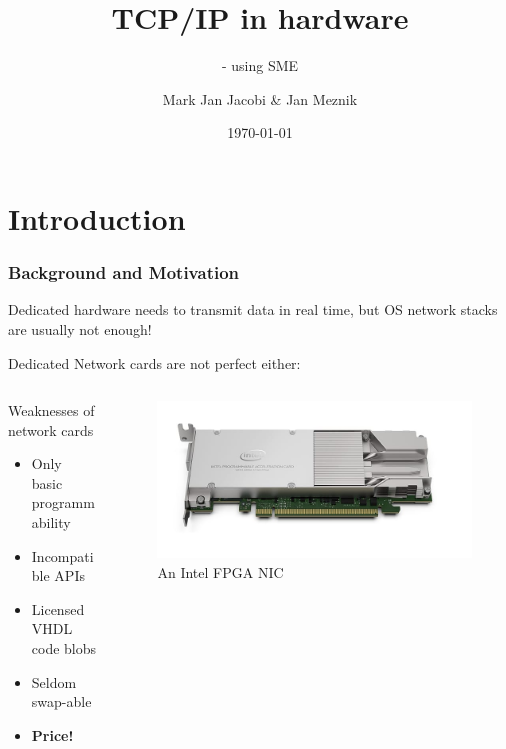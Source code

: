 \documentclass{beamer}
\title{TCP/IP in hardware }
\subtitle{- using SME}
\author{Mark Jan Jacobi \& Jan Meznik}
\institute{University of Copenhagen}
\date{\today}
\begin{document}
\frame{\titlepage}

\section{Introduction}
\begin{frame}
  \frametitle{Background and Motivation}

  Dedicated hardware needs to transmit data in real time, but OS network
  stacks are usually not enough!

  Dedicated Network cards are not perfect either:
  \begin{columns}

 \begin{column}{0.7\textwidth}
  \begin{alertblock}{Weaknesses of network cards}
    \begin{itemize}
      \item Only basic programmability
      \item Incompatible APIs
      \item Licensed VHDL code blobs
      \item Seldom swap-able
      \item \textbf{Price!}
    \end{itemize}
  \end{alertblock}
  \end{column}

  \begin{column}{0.3\textwidth}
    \begin{figure}
    \includegraphics[scale=0.15,angle=270]{intel_fpga_nic.jpg}
    \caption{An Intel FPGA NIC}
    \end{figure}
  \end{column}

\end{columns}


\end{frame}
\end{document}
